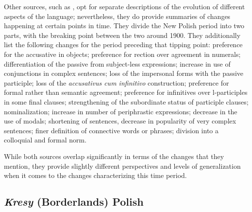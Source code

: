 Other sources, such as \citet{długosz-kurczabowa_dubisz_2006}, opt for separate descriptions of the evolution of different aspects of the language; nevertheless, they do provide summaries of changes happening at certain points in time. They divide the New Polish period into two parts, with the breaking point between the two around 1900. They additionally list the following changes for the period preceding that tipping point: preference for the accusative in objects; preference for rection over agreement in numerals; differentiation of the passive from subject-less expressions; increase in use of conjunctions in complex sentences; loss of the impersonal forms with the passive participle; loss of the \textit{accusativus cum infinitivo} construction; preference for formal rather than semantic agreement; preference for infinitives over l-participles in some final clauses; strengthening of the subordinate status of participle clauses; nominalization; increase in number of periphrastic expressions; decrease in the use of modals; shortening of sentences, decrease in popularity of very complex sentences; finer definition of connective words or phrases; division into a colloquial and formal norm. 

While both sources overlap significantly in terms of the changes that they mention, they provide slightly different perspectives and levels of generalization when it comes to the changes characterizing this time period.


\subsection{\textit{Kresy} (Borderlands) Polish}
\label{subsec:history-kresy}

